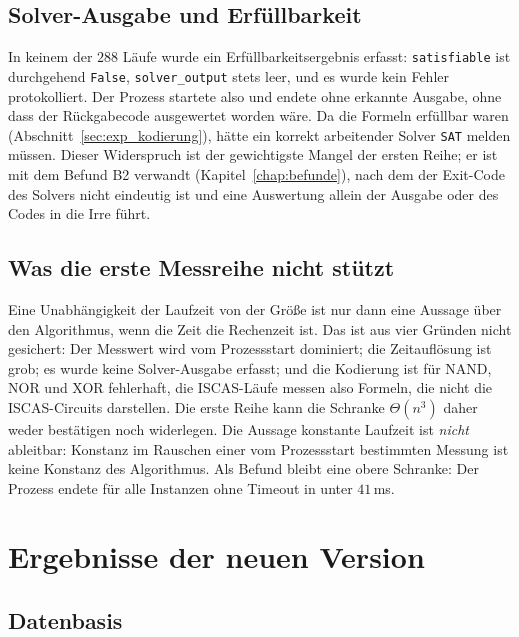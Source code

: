 \subsection{Solver-Ausgabe und Erfüllbarkeit}
\label{sec:exp_erste_ausgabe}

In keinem der $288$ Läufe wurde ein Erfüllbarkeitsergebnis erfasst: \texttt{satisfiable} ist durchgehend \texttt{False}, \texttt{solver\_output} stets leer, und es wurde kein Fehler protokolliert. Der Prozess startete also und endete ohne erkannte Ausgabe, ohne dass der Rückgabecode ausgewertet worden wäre. Da die Formeln erfüllbar waren (Abschnitt~\ref{sec:exp_kodierung}), hätte ein korrekt arbeitender Solver \texttt{SAT} melden müssen. Dieser Widerspruch ist der gewichtigste Mangel der ersten Reihe; er ist mit dem Befund B2 verwandt (Kapitel~\ref{chap:befunde}), nach dem der Exit-Code des Solvers nicht eindeutig ist und eine Auswertung allein der Ausgabe oder des Codes in die Irre führt.

\subsection{Was die erste Messreihe nicht stützt}

Eine Unabhängigkeit der Laufzeit von der Größe ist nur dann eine Aussage über den Algorithmus, wenn die Zeit die Rechenzeit ist. Das ist aus vier Gründen nicht gesichert: Der Messwert wird vom Prozessstart dominiert; die Zeitauflösung ist grob; es wurde keine Solver-Ausgabe erfasst; und die Kodierung ist für NAND, NOR und XOR fehlerhaft, die ISCAS-Läufe messen also Formeln, die nicht die ISCAS-Circuits darstellen. Die erste Reihe kann die Schranke $\Theta(n^3)$ daher weder bestätigen noch widerlegen. Die Aussage \glqq konstante Laufzeit\grqq{} ist \emph{nicht} ableitbar: Konstanz im Rauschen einer vom Prozessstart bestimmten Messung ist keine Konstanz des Algorithmus. Als Befund bleibt eine obere Schranke: Der Prozess endete für alle Instanzen ohne Timeout in unter $41$\,ms.

\section{Ergebnisse der neuen Version}
\label{sec:exp_neue}

\subsection{Datenbasis}
\label{sec:exp_daten}

